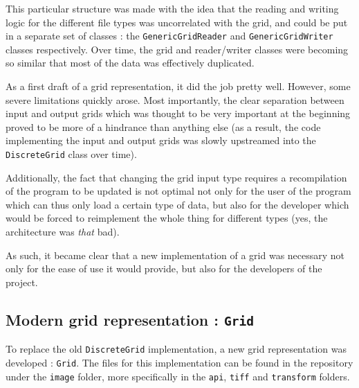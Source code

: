 {{		\vspace{\baselineskip}

		This particular structure was made with the idea that the reading and writing logic for the different file types was uncorrelated with the grid, and could be put in a separate set of classes : the \texttt{GenericGridReader} and \texttt{GenericGridWriter} classes respectively. Over time, the grid and reader/writer classes were becoming so similar that most of the data was effectively duplicated.

		As a first draft of a grid representation, it did the job pretty well. However, some severe limitations quickly arose. Most importantly, the clear separation between input and output grids which was thought to be very important at the beginning proved to be more of a hindrance than anything else (as a result, the code implementing the input and output grids was slowly upstreamed into the \texttt{DiscreteGrid} class over time).\par

		\vspace{\baselineskip}

		Additionally, the fact that changing the grid input type requires a recompilation of the program to be updated is not optimal not only for the user of the program which can thus only load a certain type of data, but also for the developer which would be forced to reimplement the whole thing for different types (yes, the architecture was \textit{that} bad).\par

		As such, it became clear that a new implementation of a grid was necessary not only for the ease of use it would provide, but also for the developers of the project.
	}

	\subsection{Modern grid representation : \texttt{Grid}}\label{text:03_software_components:01_image_representation:02_modern_grid}
	{

		To replace the old \texttt{DiscreteGrid} implementation, a new grid representation was developed : \texttt{Grid}. The files for this implementation can be found in the repository under the \texttt{image} folder, more specifically in the \texttt{api}, \texttt{tiff} and \texttt{transform} folders.\par

}}
